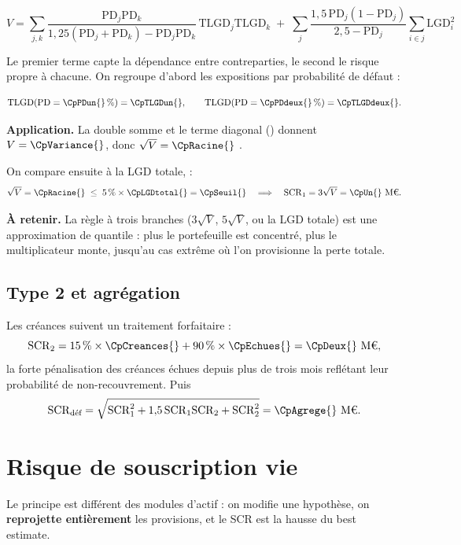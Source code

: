 \documentclass[11pt,a4paper]{article}
\newcommand{\astuce}[1]{\par\smallskip\noindent\textcolor{vertfonce}{\textbf{À retenir.}} #1\par\smallskip}
\newcommand{\Meuro}{\text{M\texteuro}}
\begin{document}
\[
V = \sum_{j,k} \frac{\mathrm{PD}_j \mathrm{PD}_k}
{1{,}25(\mathrm{PD}_j+\mathrm{PD}_k) - \mathrm{PD}_j\mathrm{PD}_k}\,
\mathrm{TLGD}_j \mathrm{TLGD}_k
\;+\; \sum_j \frac{1{,}5\,\mathrm{PD}_j(1-\mathrm{PD}_j)}{2{,}5-\mathrm{PD}_j}
\sum_{i \in j}\mathrm{LGD}_i^2
\]

Le premier terme capte la dépendance entre contreparties, le second le risque propre à chacune.
On regroupe d'abord les expositions par probabilité de défaut :

\[
\mathrm{TLGD}(\mathrm{PD}=\CpPDun{}\,\%) = \CpTLGDun{}, \qquad
\mathrm{TLGD}(\mathrm{PD}=\CpPDdeux{}\,\%) = \CpTLGDdeux{}.
\]

\begin{methode}
\textbf{Application.} La double somme et le terme diagonal (\CpDiagonale{}) donnent
$V = \CpVariance{}$, donc $\sqrt{V} = \CpRacine{}$ \Meuro{}.

On compare ensuite à la LGD totale, \CpLGDtotal{} \Meuro{} :
\[
\sqrt{V} = \CpRacine{} \;\le\; 5\,\% \times \CpLGDtotal{} = \CpSeuil{}
\quad\Longrightarrow\quad
\mathrm{SCR}_1 = 3\sqrt{V} = \CpUn{}~\Meuro{}.
\]
\end{methode}

\astuce{La règle à trois branches ($3\sqrt{V}$, $5\sqrt{V}$, ou la LGD totale) est une
approximation de quantile : plus le portefeuille est concentré, plus le multiplicateur monte,
jusqu'au cas extrême où l'on provisionne la perte totale.}

\subsection{Type 2 et agrégation}

Les créances suivent un traitement forfaitaire :
\[
\mathrm{SCR}_2 = 15\,\% \times \CpCreances{} + 90\,\% \times \CpEchues{} = \CpDeux{}~\Meuro{},
\]
la forte pénalisation des créances échues depuis plus de trois mois reflétant leur probabilité
de non-recouvrement. Puis
\[
\mathrm{SCR}_{\text{déf}} = \sqrt{\mathrm{SCR}_1^2 + 1{,}5\,\mathrm{SCR}_1\mathrm{SCR}_2
+ \mathrm{SCR}_2^2} = \CpAgrege{}~\Meuro{}.
\]

\section{Risque de souscription vie}

Le principe est différent des modules d'actif : on modifie une hypothèse, on \textbf{reprojette
entièrement} les provisions, et le SCR est la hausse du best estimate.
\end{document}
